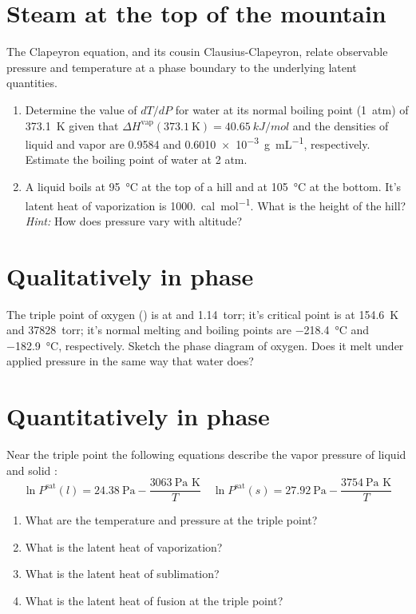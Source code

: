 \documentclass[11pt]{article}
\begin{document}
\section{Steam at the top of the mountain}
\label{sec:org5ff9310}
The Clapeyron equation, and its cousin Clausius-Clapeyron, relate observable
  pressure and temperature at a phase boundary to the underlying latent
  quantities.
\begin{enumerate}
\item Determine the value of \(dT/dP\) for water at its normal boiling point (\SI{1}{atm})
of \SI{373.1}{K} given that \(\Delta
   H^\text{vap}(373.1~\text{K})=\SI{40.65}{kJ/mol}\) and the densities of liquid
and vapor are 0.9584 and \SI{0.6010e-3}{\gram\per\milli\liter}, respectively.
Estimate the boiling point of water at 2 atm.

\item A liquid boils at \SI{95}{\celsius} at the top of a hill and at \SI{105}{\celsius} at the
bottom.  It's latent heat of vaporization is \SI{1000.}{cal\per\mole}.  What is the height
of the hill?  \emph{Hint:} How does pressure vary with altitude?
\end{enumerate}

\section{Qualitatively in phase}
\label{sec:org6113f55}
The triple point of oxygen () is at  and \SI{1.14}{torr}; it's
  critical point is at \SI{154.6}{K} and \SI{37828}{torr}; it's normal melting and boiling
  points are \SI{-218.4}{\celsius} and \SI{-182.9}{\celsius}, respectively.
  Sketch the phase diagram of oxygen.  Does it melt under applied pressure in
  the same way that water does?

\section{Quantitatively in phase}
\label{sec:org2842449}
Near the triple point the following equations describe the vapor pressure of
    liquid and solid :
\begin{equation*}
  \ln P^\text{sat}(l) = 24.38~\text{Pa} - \frac{3063~\text{Pa K}}{T} \quad  \ln P^\text{sat}(s) = 27.92~\text{Pa} - \frac{3754~\text{Pa K}}{T}
\end{equation*}

\begin{enumerate}
\item What are the temperature and pressure at the triple point?
\item What is the latent heat of vaporization?
\item What is the latent heat of sublimation?
\item What is the latent heat of fusion at the triple point?
\end{enumerate}
\end{document}
